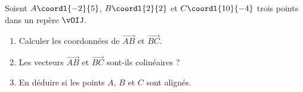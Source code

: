 \begin{exo}{}
	Soient $A\coordl{-2}{5}$, $B\coordl{2}{2}$ et $C\coordl{10}{-4}$ trois points dans un repère $\vOIJ$.

	\begin{enumerate}
		\item Calculer les coordonnées de $\vec{AB}$ et $\vec{BC}$.
		\item Les vecteurs $\vec{AB}$ et $\vec{BC}$ sont-ils colinéaires ?
		\item En déduire si les points $A$, $B$ et $C$ sont alignés.
	\end{enumerate}
\end{exo}
